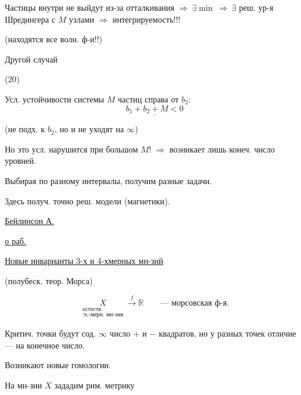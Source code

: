 Частицы внутри не выйдут из-за отталкивания
$\Longrightarrow\ \exists\min\ \Longrightarrow\ \exists$ реш. ур-я Шредингера
с $M$ узлами $\Longrightarrow$ интегрируемость!!!

(находятся все волн. ф-и!!)

Другой случай

(20)
\begin{center}

\end{center}

Усл. устойчивости системы $M$ частиц справа от $b_2$:
\begin{equation*}
\underline{b_1+b_2+M<0}
\tag{21}
\end{equation*}

(не подх. к $b_2$, но и не уходят на $\infty$)

Но это усл. нарушится при большом $M$!
$\Longrightarrow$ возникает лишь конеч. число уровней.


Выбирая по разному интервалы, получим разные задачи.

Здесь получ. точно реш. модели (магнетики).

\underline{\underline{Бейлинсон А.}}

\underline{о раб. }

\underline{Новые инварианты 3-х и 4-хмерных мн-зий}

(полубеск. теор. Морса)

\begin{equation*}
\underset{\substack{\text{естеств.}\\\infty\text{-мерн. мн-зия}}}{X}
\overset{f}{\longrightarrow}\mathbb{R}
\qquad\text{— морсовская ф-я.}
\end{equation*}

Критич. точки будут сод. $\infty$ число $+$ и $-$ квадратов, но
у разных точек отличие — на конечное число.

Возникают новые гомологии.

На мн-зии $X$ зададим рим. метрику

